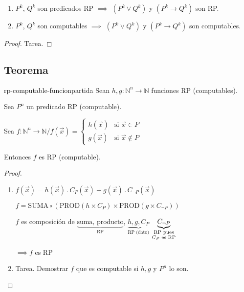 \begin{corolario}{}{}
    \begin{enumerate}
        \item ${P}^k$, ${Q}^k$ son predicados RP $\implies$
            $({P}^k \vee {Q}^k)$ y 
            $({P}^k \to {Q}^k)$ son RP.
        \item ${P}^k$, ${Q}^k$ son computables $\implies$
            $({P}^k \vee {Q}^k)$ y 
            $({P}^k \to {Q}^k)$ son computables.
    \end{enumerate}
\end{corolario}

\begin{proof}
    Tarea.
\end{proof}

\subsection{Teorema}
%
\begin{teorema}{}{rp-computable-funcionpartida}
    Sean $h,g: \mathbb{N}^n \to \mathbb{N}$ funciones RP (computables).

    Sea ${P}^n$ un predicado RP (computable).

    Sea $f: \mathbb{N}^n \to \mathbb{N} / f(\overrightarrow{x}) = \begin{cases}
        h(\overrightarrow{x}) & \text{si } \overrightarrow{x} \in {P}\\
        g(\overrightarrow{x}) & \text{si } \overrightarrow{x}\notin{P}
    \end{cases}$

    \medskip

    Entonces $f$ es RP (computable).
\end{teorema}

\begin{proof} \phantom{.}

    \begin{enumerate}
        \item $f(\overrightarrow{x}) = 
            h(\overrightarrow{x}) \, . \, C_{{P}}(\overrightarrow{x}) 
            + g(\overrightarrow{x}) \, . \, C_{\neg P} (\overrightarrow{x})$

            $f = \mathrm{SUMA} \circ (\mathrm{PROD}( h \times C_{{P}} ) \times  \mathrm{PROD} (g \times C_{\neg P}))$

            $f$ es composición de 
            $\underbrace{\text{suma, producto}}_{\text{RP}}$,
            $\underbrace{h, g, C_{{P}}}_{\text{RP (dato)}}$
            $\underbrace{C_{\neg {P}}}_{%
                \substack{\text{RP pues}\\ C_{{P}} \text{ es RP}}}$
            \begin{center}
                $\implies f$ es RP
            \end{center}

        \item Tarea. Demostrar $f$ que es computable si $h, g$ y $P^n$ lo son.
    \end{enumerate}
\end{proof}


